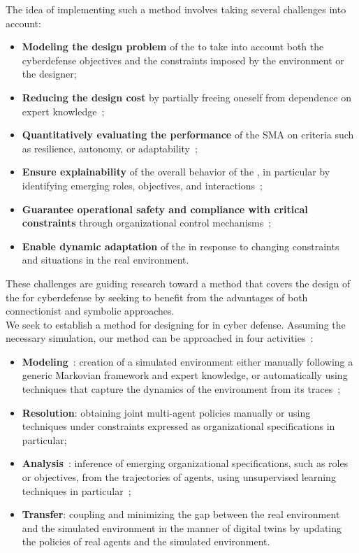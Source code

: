 \noindent
The idea of implementing such a method involves taking several challenges into account:
\begin{itemize}
  \item \textbf{Modeling the design problem} of the  to take into account both the cyberdefense objectives and the constraints imposed by the environment or the designer;

  \item \textbf{Reducing the design cost} by partially freeing oneself from dependence on expert knowledge~;
  \item \textbf{Quantitatively evaluating the performance} of the SMA on criteria such as resilience, autonomy, or adaptability~;

  \item \textbf{Ensure explainability} of the overall behavior of the , in particular by identifying emerging roles, objectives, and interactions~;
  \item \textbf{Guarantee operational safety and compliance with critical constraints} through organizational control mechanisms~;

  \item \textbf{Enable dynamic adaptation} of the  in response to changing constraints and situations in the real environment.
\end{itemize}
\noindent
These challenges are guiding research toward a method that covers the design of the  for cyberdefense by seeking to benefit from the advantages of both connectionist and symbolic approaches.
\
\bigskip
{}\\
\noindent
We seek to establish a method for designing  for  in cyber defense. Assuming the necessary simulation, our method can be approached in four activities~:
\begin{itemize}
  \item \textbf{Modeling}~: creation of a simulated environment either manually following a generic Markovian framework and expert knowledge, or automatically using  techniques that capture the dynamics of the environment from its traces~;
  \item \textbf{Resolution}: obtaining joint multi-agent policies manually or using \acn{ML} techniques under constraints expressed as organizational specifications in particular;
  \item \textbf{Analysis}~: inference of emerging organizational specifications, such as roles or objectives, from the trajectories of agents, using unsupervised learning techniques in particular~;
  \item \textbf{Transfer}: coupling and minimizing the gap between the real environment and the simulated environment in the manner of digital twins by updating the policies of real agents and the simulated environment.
\end{itemize}


